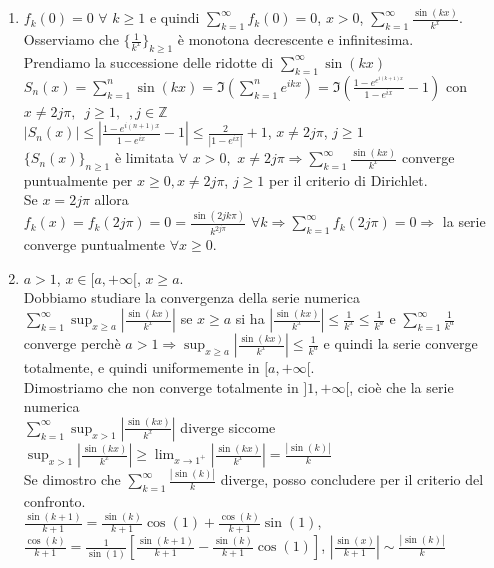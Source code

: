 \documentclass{article}
\newcommand{\Z}{\mathbb{Z}}
\begin{document}
\begin{enumerate}
    \item $f_k(0)=0\,\, \forall\,\, k \geq 1 $ e quindi $\sum_{k=1}^{\infty} f_k(0)=0$, $x >0$, $\sum_{k=1}^{\infty} \frac{\sin(kx)}{k^x}$.\\
    Osserviamo che $\{\frac{1}{k^x}\}_{k \geq 1}$ è monotona decrescente e infinitesima.\\
    Prendiamo la successione delle ridotte di $\sum_{k=1}^{\infty}\sin(kx)$\\
    $S_n(x)=\sum_{k=1}^{n}\sin(kx)= \Im \left(\sum_{k=1}^{n}e^{ikx}\right)=\Im \left( \frac{1-e^{e^{i(k+1)x}}}{1-e^{ix}}-1\right) $ con $x \neq 2j\pi,\,\,\, j \geq 1, \,\,\, , j \in \Z$\\
    $|S_n(x)|\leq |\frac{1-e^{i(n+1)x}}{1-e^{ix}}-1|\leq \frac{2}{|1-e^{ix}|}+1$, $x \neq 2j\pi$, $j \geq 1$\\
    $\{S_n(x)\}_{n \geq 1}$ è limitata $\forall\,\, x >0,\,\, x \neq 2j\pi \Rightarrow \sum_{k=1}^{\infty}\frac{\sin(kx)}{k^x}$ converge puntualmente per $x \geq 0, x \neq 2j\pi$, $j \geq 1$ per il criterio di Dirichlet.\\
    Se $x = 2j \pi$ allora $f_k(x)=f_k(2j\pi)=0 = \frac{\sin(2jk\pi)}{k^{2j\pi}} \,\, \forall k \Rightarrow \sum_{k=1}^{\infty} f_k(2j\pi)=0\Rightarrow$ la serie converge puntualmente $\forall x \geq 0$.
    \item $a > 1$, $x \in [a,+\infty[$, $x\geq a $.\\
    Dobbiamo studiare la convergenza della serie numerica $\sum_{k=1}^{\infty}\sup_{x \geq a}|\frac{\sin(kx)}{k^x}|$ se $x \geq a$ si ha $|\frac{\sin(kx)}{k^x}|\leq \frac{1}{k^x}\leq \frac{1}{k^a}$ e $\sum_{k=1}^{\infty}\frac{1}{k^a}$ converge perchè $a > 1 \Rightarrow \sup_{x \geq a}|\frac{\sin(kx)}{k^x}| \leq \frac{1}{k^a}$ e quindi la serie converge totalmente, e quindi uniformemente in $[a,+\infty[$.\\
    Dimostriamo che non converge totalmente in $]1,+\infty[$, cioè che la serie numerica \\$\sum_{k=1}^{\infty}\sup_{x >1}|\frac{\sin(kx)}{k^x}| $
    diverge siccome $\sup_{x >1}|\frac{\sin(kx)}{k^x}|\geq \lim_{x \rightarrow 1^+}|\frac{\sin(kx)}{k^x}|=\frac{|\sin (k)|}{k}$\\
    Se dimostro che $\sum_{k=1}^{\infty}\frac{|\sin(k)|}{k}$ diverge, posso concludere per il criterio del confronto.\\
    $\frac{\sin(k+1)}{k+1}=\frac{\sin (k)}{k+1}\cos (1) +\frac{\cos(k)}{k+1}\sin(1)$, $\frac{\cos(k)}{k+1}=\frac{1}{\sin(1)}\left[\frac{\sin(k+1)}{k+1} -\frac{\sin(k)}{k+1} \cos(1) \right]$, $|\frac{\sin(x)}{k+1}| \sim \frac{|\sin(k)|}{k}$\\

\end{enumerate}
\end{document}
